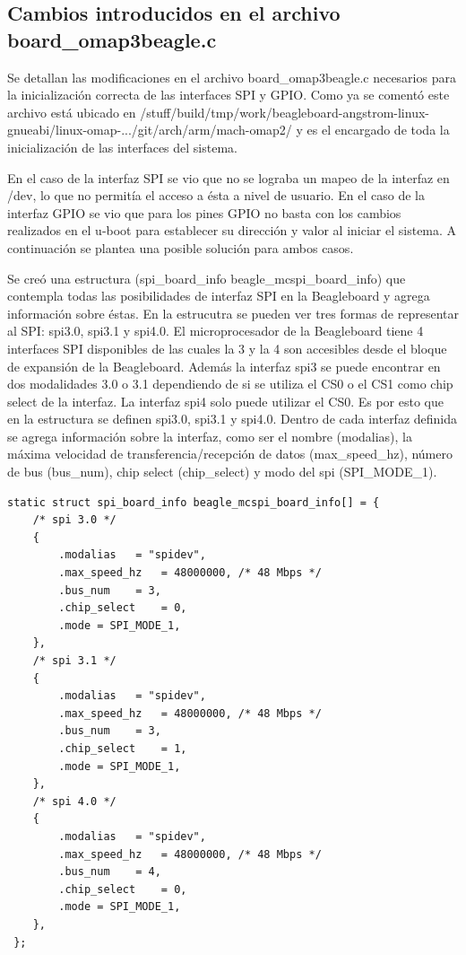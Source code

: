 \subsection{Cambios introducidos en el archivo board\_omap3beagle.c}\label{anx_sw_uIm}

Se detallan las modificaciones en el archivo board\_omap3beagle.c necesarios para la inicialización correcta de las interfaces SPI y GPIO. Como ya se comentó este archivo está ubicado en /stuff/build/tmp/work/beagleboard-angstrom-linux-gnueabi/linux-omap-.../git/arch/arm/mach-omap2/ y es el encargado de toda la inicialización de las interfaces del sistema.

\bigskip
En el caso de la interfaz SPI se vio que no se lograba un mapeo de la interfaz en /dev, lo que no permitía el acceso a ésta a nivel de usuario. En el caso de la interfaz GPIO se vio que para los pines GPIO no basta con los cambios realizados en el u-boot para establecer su dirección y valor al iniciar el sistema.
A continuación se plantea una posible solución para ambos casos.

\bigskip
{}

\bigskip
Se creó una estructura (spi\_board\_info beagle\_mcspi\_board\_info) que contempla todas las posibilidades de interfaz SPI en la Beagleboard y agrega información sobre éstas.
En la estrucutra se pueden ver tres formas de representar al SPI: spi3.0, spi3.1 y spi4.0. El microprocesador de la Beagleboard tiene 4 interfaces SPI disponibles de las cuales la 3 y la 4 son accesibles desde el bloque de expansión de la Beagleboard. Además la interfaz spi3 se puede encontrar en dos modalidades 3.0 o 3.1 dependiendo de si se utiliza el CS0 o el CS1 como chip select de la interfaz. La interfaz spi4 solo puede utilizar el CS0.
Es por esto que en la estructura se definen spi3.0, spi3.1 y spi4.0.
Dentro de cada interfaz definida se agrega información sobre la interfaz, como ser el nombre (modalias), la máxima velocidad de transferencia/recepción de datos (max\_speed\_hz), número de bus (bus\_num), chip select (chip\_select) y modo del spi (SPI\_MODE\_1).

\begin{verbatim}
static struct spi_board_info beagle_mcspi_board_info[] = { 
    /* spi 3.0 */ 
    { 
        .modalias	= "spidev", 
        .max_speed_hz	= 48000000, /* 48 Mbps */ 
        .bus_num	= 3, 
        .chip_select	= 0,	 
        .mode = SPI_MODE_1, 
    }, 
    /* spi 3.1 */ 
    { 
        .modalias	= "spidev", 
        .max_speed_hz	= 48000000, /* 48 Mbps */ 
        .bus_num	= 3, 
        .chip_select	= 1,	 
        .mode = SPI_MODE_1, 
    }, 
    /* spi 4.0 */ 
    { 
        .modalias	= "spidev", 
        .max_speed_hz	= 48000000, /* 48 Mbps */ 
        .bus_num	= 4, 
        .chip_select	= 0,	 
        .mode = SPI_MODE_1, 
    }, 
 }; 
\end{verbatim}

